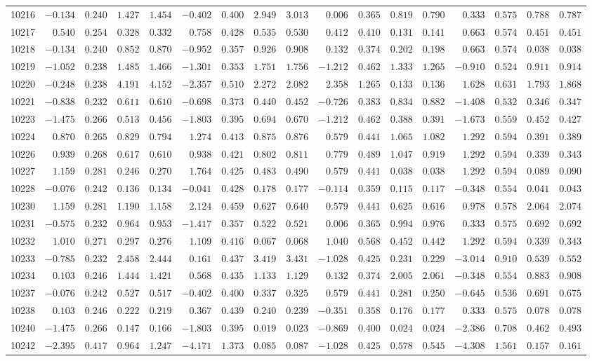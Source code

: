 \begin{landscape}
{\begin{longtable}{l|rrrr|rrrr|rrrr|rrrr}
10216&$-0.134$&$0.240$&$1.427$&$1.454$&$-0.402$&$0.400$&$2.949$&$3.013$&$ 0.006$&$0.365$&$0.819$&$0.790$&$ 0.333$&$0.575$&$0.788$&$0.787$\tabularnewline
10217&$ 0.540$&$0.254$&$0.328$&$0.332$&$ 0.758$&$0.428$&$0.535$&$0.530$&$ 0.412$&$0.410$&$0.131$&$0.141$&$ 0.663$&$0.574$&$0.451$&$0.451$\tabularnewline
10218&$-0.134$&$0.240$&$0.852$&$0.870$&$-0.952$&$0.357$&$0.926$&$0.908$&$ 0.132$&$0.374$&$0.202$&$0.198$&$ 0.663$&$0.574$&$0.038$&$0.038$\tabularnewline
10219&$-1.052$&$0.238$&$1.485$&$1.466$&$-1.301$&$0.353$&$1.751$&$1.756$&$-1.212$&$0.462$&$1.333$&$1.265$&$-0.910$&$0.524$&$0.911$&$0.914$\tabularnewline
10220&$-0.248$&$0.238$&$4.191$&$4.152$&$-2.357$&$0.510$&$2.272$&$2.082$&$ 2.358$&$1.265$&$0.133$&$0.136$&$ 1.628$&$0.631$&$1.793$&$1.868$\tabularnewline
10221&$-0.838$&$0.232$&$0.611$&$0.610$&$-0.698$&$0.373$&$0.440$&$0.452$&$-0.726$&$0.383$&$0.834$&$0.882$&$-1.408$&$0.532$&$0.346$&$0.347$\tabularnewline
10223&$-1.475$&$0.266$&$0.513$&$0.456$&$-1.803$&$0.395$&$0.694$&$0.670$&$-1.212$&$0.462$&$0.388$&$0.391$&$-1.673$&$0.559$&$0.452$&$0.427$\tabularnewline
10224&$ 0.870$&$0.265$&$0.829$&$0.794$&$ 1.274$&$0.413$&$0.875$&$0.876$&$ 0.579$&$0.441$&$1.065$&$1.082$&$ 1.292$&$0.594$&$0.391$&$0.389$\tabularnewline
10226&$ 0.939$&$0.268$&$0.617$&$0.610$&$ 0.938$&$0.421$&$0.802$&$0.811$&$ 0.779$&$0.489$&$1.047$&$0.919$&$ 1.292$&$0.594$&$0.339$&$0.343$\tabularnewline
10227&$ 1.159$&$0.281$&$0.246$&$0.270$&$ 1.764$&$0.425$&$0.483$&$0.490$&$ 0.579$&$0.441$&$0.038$&$0.038$&$ 1.292$&$0.594$&$0.089$&$0.090$\tabularnewline
10228&$-0.076$&$0.242$&$0.136$&$0.134$&$-0.041$&$0.428$&$0.178$&$0.177$&$-0.114$&$0.359$&$0.115$&$0.117$&$-0.348$&$0.554$&$0.041$&$0.043$\tabularnewline
10230&$ 1.159$&$0.281$&$1.190$&$1.158$&$ 2.124$&$0.459$&$0.627$&$0.640$&$ 0.579$&$0.441$&$0.625$&$0.616$&$ 0.978$&$0.578$&$2.064$&$2.074$\tabularnewline
10231&$-0.575$&$0.232$&$0.964$&$0.953$&$-1.417$&$0.357$&$0.522$&$0.521$&$ 0.006$&$0.365$&$0.994$&$0.976$&$ 0.333$&$0.575$&$0.692$&$0.692$\tabularnewline
10232&$ 1.010$&$0.271$&$0.297$&$0.276$&$ 1.109$&$0.416$&$0.067$&$0.068$&$ 1.040$&$0.568$&$0.452$&$0.442$&$ 1.292$&$0.594$&$0.339$&$0.343$\tabularnewline
10233&$-0.785$&$0.232$&$2.458$&$2.444$&$ 0.161$&$0.437$&$3.419$&$3.431$&$-1.028$&$0.425$&$0.231$&$0.229$&$-3.014$&$0.910$&$0.539$&$0.552$\tabularnewline
10234&$ 0.103$&$0.246$&$1.444$&$1.421$&$ 0.568$&$0.435$&$1.133$&$1.129$&$ 0.132$&$0.374$&$2.005$&$2.061$&$-0.348$&$0.554$&$0.883$&$0.908$\tabularnewline
10237&$-0.076$&$0.242$&$0.527$&$0.517$&$-0.402$&$0.400$&$0.337$&$0.325$&$ 0.579$&$0.441$&$0.281$&$0.250$&$-0.645$&$0.536$&$0.691$&$0.675$\tabularnewline
10238&$ 0.103$&$0.246$&$0.222$&$0.219$&$ 0.367$&$0.439$&$0.240$&$0.239$&$-0.351$&$0.358$&$0.176$&$0.177$&$ 0.333$&$0.575$&$0.078$&$0.078$\tabularnewline
10240&$-1.475$&$0.266$&$0.147$&$0.166$&$-1.803$&$0.395$&$0.019$&$0.023$&$-0.869$&$0.400$&$0.024$&$0.024$&$-2.386$&$0.708$&$0.462$&$0.493$\tabularnewline
10242&$-2.395$&$0.417$&$0.964$&$1.247$&$-4.171$&$1.373$&$0.085$&$0.087$&$-1.028$&$0.425$&$0.578$&$0.545$&$-4.308$&$1.561$&$0.157$&$0.161$\tabularnewline
\hline
\end{longtable}}\end{landscape}


